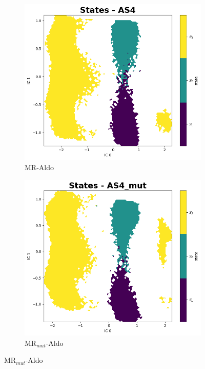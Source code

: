 \documentclass[
  journal=usp, %
  manuscript=final-report,
  year=2023,
  volume=1,
]{cup-journal}
\begin{document}
{\begin{figure}[hbt!]
\begin{subfigure}{.45\linewidth}
  \includegraphics[width=\linewidth]{Images/States_AS4_7000K.png}
  \caption{MR-Aldo}
  \label{MC_states_MR-as4}
\end{subfigure}\hfill %
\begin{subfigure}{.45\linewidth}
  \includegraphics[width=\linewidth]{Images/States_AS4_mut_7000K.png}
  \caption{MR$_{mut}$-Aldo}
  \label{MC_states_MR-as4_mut}
\end{subfigure}


\end{figure}}
\end{document}
